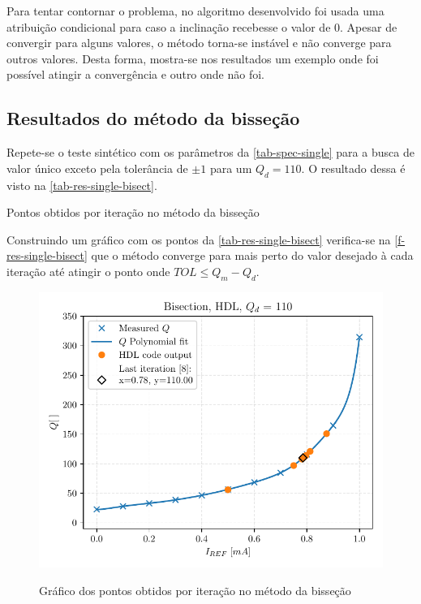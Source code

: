 Para tentar contornar o problema, no algoritmo desenvolvido foi usada uma atribuição condicional para caso a inclinação recebesse o valor de 0. Apesar de convergir para alguns valores, o método torna-se instável e não converge para outros valores. Desta forma, mostra-se nos resultados um exemplo onde foi possível atingir a convergência e outro onde não foi.

\subsection{Resultados do método da bisseção}

Repete-se o teste sintético com os parâmetros da \autoref{tab-spec-single} para a busca de valor único exceto pela tolerância de $\pm 1$ para um $Q_d = 110$. O resultado dessa é visto na \autoref{tab-res-single-bisect}.

\begin{table}[H]
    \centering
    \caption{Pontos obtidos por iteração no método da bisseção}
        
    \label{tab-res-single-bisect}
\end{table}

Construindo um gráfico com os pontos da \autoref{tab-res-single-bisect} verifica-se na \autoref{f-res-single-bisect} que o método converge para mais perto do valor desejado à cada iteração até atingir o ponto onde $TOL \leq Q_m - Q_d$.

\begin{figure}[H]
    \centering
    \caption{Gráfico dos pontos obtidos por iteração no método da bisseção}
    \includegraphics[width=.5\textwidth]{fig/res-bisect-single-hdl.pdf}
    \label{f-res-single-bisect}
\end{figure}






